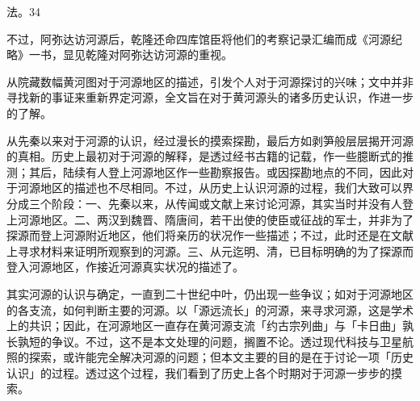 \vfill
\begin{BookNotes}
\end{BookNotes}

\noindent 法。34

不过，阿弥达访河源后，乾隆还命四库馆臣将他们的考察记录汇编而成《河源纪略》一书，显见乾隆对阿弥达访河源的重视。


\vfill
\begin{BookNotes}
\end{BookNotes}



从院藏数幅黄河图对于河源地区的描述，引发个人对于河源探讨的兴味；文中并非寻找新的事证来重新界定河源，全文旨在对于黄河源头的诸多历史认识，作进一步的了解。

从先秦以来对于河源的认识，经过漫长的摸索探勘，最后方如剥笋般层层揭开河源的真相。历史上最初对于河源的解释，是透过经书古籍的记载，作一些臆断式的推测；其后，陆续有人登上河源地区作一些勘察报告。或因探勘地点的不同，因此对于河源地区的描述也不尽相同。不过，从历史上认识河源的过程，我们大致可以界分成三个阶段：一、先秦以来，从传闻或文献上来讨论河源，其实当时并没有人登上河源地区。二、两汉到魏晋、隋唐间，若干出使的使臣或征战的军士，并非为了探源而登上河源附近地区，他们将亲历的状况作一些描述；不过，此时还是在文献上寻求材料来证明所观察到的河源。三、从元迄明、清，已目标明确的为了探源而登入河源地区，作接近河源真实状况的描述了。

其实河源的认识与确定，一直到二十世纪中叶，仍出现一些争议；如对于河源地区的各支流，如何判断主要的河源。以「源远流长」的河源，来寻求河源，这是学术上的共识；因此，在河源地区一直存在黄河源支流「约古宗列曲」与「卡日曲」孰长孰短的争议。不过，这不是本文处理的问题，搁置不论。透过现代科技与卫星航照的探索，或许能完全解决河源的问题；但本文主要的目的是在于讨论一项「历史认识」的过程。透过这个过程，我们看到了历史上各个时期对于河源一步步的摸索。


